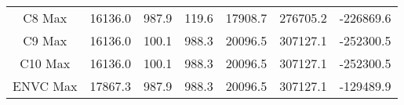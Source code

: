 \begin{table}[H]
{\begin{tabular}{ccccccc}
    C8 Max & 16136.0 & \cellcolor[rgb]{ .949,  .949,  .949}987.9 & \cellcolor[rgb]{ .949,  .949,  .949}119.6 & 17908.7 & 276705.2 & -226869.6 \\
    C9 Max & 16136.0 & \cellcolor[rgb]{ .949,  .949,  .949}100.1 & \cellcolor[rgb]{ .949,  .949,  .949}988.3 & 20096.5 & 307127.1 & -252300.5 \\
    C10 Max & 16136.0 & \cellcolor[rgb]{ .949,  .949,  .949}100.1 & \cellcolor[rgb]{ .949,  .949,  .949}988.3 & 20096.5 & 307127.1 & -252300.5 \\
    ENVC Max & 17867.3 & \cellcolor[rgb]{ .949,  .949,  .949}987.9 & \cellcolor[rgb]{ .949,  .949,  .949}988.3 & 20096.5 & 307127.1 & -129489.9 \bigstrut[b]\\
    \hline
  \end{tabular}
  }
  \label{tabla-cortes-basales}
\end{table}
